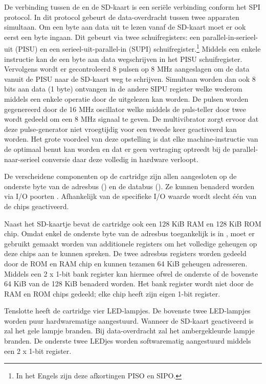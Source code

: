 De verbinding tussen de  en de SD-kaart is een seriële verbinding conform het SPI protocol. In dit protocol gebeurt de data-overdracht tussen twee apparaten simultaan. Om een byte aan data uit te lezen vanaf de SD-kaart moet er ook eerst een byte ingaan. Dit gebeurt via twee schuifregisters: een parallel-in-serieel-uit (PISU) en een serieel-uit-parallel-in (SUPI) schuifregister.\footnote{In het Engels zijn deze afkortingen PISO en SIPO.} Middels een enkele instructie kan de  een byte aan data wegschrijven in het PISU schuifregister. Vervolgens wordt er gecontroleerd 8 pulsen op 8 MHz aangeslagen om de data vanuit de PISU naar de SD-kaart weg te schrijven. Simultaan worden dan ook 8 bits aan data (1 byte) ontvangen in de andere SIPU register welke wederom middels een enkele operatie door de  uitgelezen kan worden. De pulsen worden gegenereerd door de 16 MHz oscillator welke middels de puls-teller door twee wordt gedeeld om een 8 MHz signaal te geven. De multivibrator zorgt ervoor dat deze pulse-generator niet vroegtijdig voor een tweede keer geactiveerd kan worden. Het grote voordeel van deze opstelling is dat elke machine-instructie van de  optimaal benut kan worden en dat er geen vertraging optreedt bij de parallel-naar-serieel conversie daar deze volledig in hardware verloopt.

De verscheidene componenten op de  cartridge zijn allen aangesloten op de onderste byte van de adresbus () en de databus (). Ze kunnen benaderd worden via I/O poorten . Afhankelijk van de specifieke I/O waarde wordt slecht één van de chips geactiveerd.

Naast het SD-kaartje bevat de  cartridge ook een 128 KiB RAM en 128 KiB ROM chip. Omdat enkel de onderste byte van de adresbus toegankelijk is in , moet er gebruikt gemaakt worden van additionele registers om het volledige geheugen op deze chips aan te kunnen spreken. De twee adresbus registers worden gedeeld door de ROM en RAM chip en kunnen tezamen 64 KiB geheugen adresseren. Middels een 2 x 1-bit bank register kan hiermee ofwel de onderste of de bovenste 64 KiB van de 128 KiB benaderd worden. Het bank register wordt niet door de RAM en ROM chips gedeeld; elke chip heeft zijn eigen 1-bit register.

Tenslotte heeft de  cartridge vier LED-lampjes. De bovenste twee LED-lampjes worden puur hardwarematige aangestuurd. Wanneer de SD-kaart geactiveerd is zal het gele lampje branden. Bij data-overdracht zal het ambergekleurde lampje branden. De onderste twee LEDjes worden softwarematig aangestuurd middels een 2 x 1-bit register.

